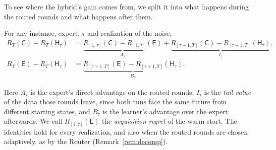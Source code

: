 \documentclass[anon]{alt2027} %
\newif\ifrevmarks\revmarkstrue
\newenvironment{revised}{\ifrevmarks\color{revcolor}\fi}{}
\newcommand{\Cold}{\mathsf{C}}
\newcommand{\Exp}{\mathsf{E}}
\newcommand{\Hyb}{\mathsf{H}}
\begin{document}
\begin{revised}
To see where the hybrid's gain comes from, we split it into what happens
during the routed rounds and what happens after them.
\end{revised}
\label{sec:decomp}

\begin{proposition}
\label{prop:decomp}
For any instance, expert, $\tau$ and realization of the noise,
\begin{align*}
R_T(\Cold)-R_T(\Hyb_\tau)
&=\underbrace{R_{[1,\tau]}(\Cold)-R_{[1,\tau]}(\Exp)}_{A_\tau}
 +\underbrace{R_{[\tau+1,T]}(\Cold)-R_{[\tau+1,T]}(\Hyb_\tau)}_{I_\tau},\\
R_T(\Exp)-R_T(\Hyb_\tau)
&=\underbrace{R_{[\tau+1,T]}(\Exp)-R_{[\tau+1,T]}(\Hyb_\tau)}_{B_\tau}.
\end{align*}
\end{proposition}

\begin{revised}
Here $A_\tau$ is the expert's direct advantage on the routed rounds,
$I_\tau$ is the \emph{tail value} of the data those rounds leave, since both
runs face the same future from different starting states, and $B_\tau$ is
the learner's advantage over the expert afterwards. We call
$R_{[1,\tau]}(\Exp)$ the \emph{acquisition regret} of the warm start. The
identities hold for every realization, and also when the routed rounds are
chosen adaptively, as by the Router (Remark~\ref{rem:decomp}).
\end{revised}
\end{document}
